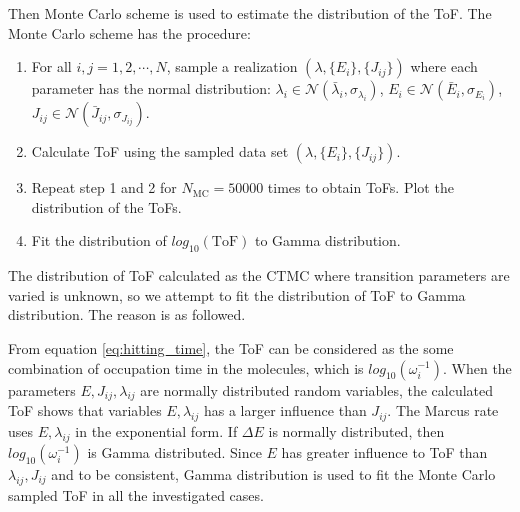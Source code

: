 \documentclass[letterpaper,12pt]{article}
\begin{document}
Then Monte Carlo scheme is used to estimate the distribution of the ToF. The Monte Carlo scheme has the procedure:
\begin{enumerate}
\item For all $i,j=1,2,\cdots, N$, sample a realization $(\lambda, \{E_i \}, \{J_{ij} \})$ where each parameter has the normal distribution: $\lambda_i \in \mathcal{N}(\bar{\lambda}_i, \sigma_{\lambda_i})$, $E_i \in \mathcal{N}(\bar{E}_i, \sigma_{E_i})$, $J_{ij} \in \mathcal{N}(\bar{J}_{ij}, \sigma_{J_{ij}})$. 
\item Calculate ToF using the sampled data set $(\lambda, \{E_i \}, \{J_{ij} \})$. 
\item Repeat step 1 and 2 for $N_\text{MC} = 50000$ times to obtain ToFs. Plot the distribution of the ToFs.
\item Fit the distribution of $log_{10}(\text{ToF})$ to Gamma distribution.
\end{enumerate}

The distribution of ToF calculated as the CTMC where transition parameters are varied is unknown, so we attempt to fit the distribution of ToF to Gamma distribution. The reason is as followed.

From equation \ref{eq:hitting_time}, the ToF can be considered as the some combination of occupation time in the molecules, which is $log_{10}(\omega_{i}^{-1})$. 
When the parameters $E, J_{ij}, \lambda_{ij}$ are normally distributed random variables, the calculated ToF shows that variables $E,\lambda_{ij}$ has a larger influence than $J_{ij}$. 
The Marcus rate uses $E,\lambda_{ij}$ in the exponential form. If $\Delta E$ is normally distributed, then $log_{10}(\omega_{i}^{-1})$ is Gamma distributed. 
Since $E$ has greater influence to ToF than $\lambda_{ij}, J_{ij}$ and to be consistent, Gamma distribution is used to fit the Monte Carlo sampled ToF in all the investigated cases.
\end{document}
